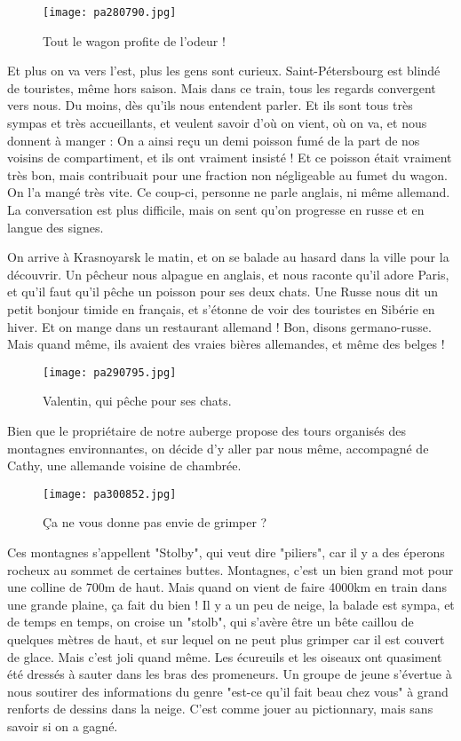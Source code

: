 \documentclass{book}
\begin{document}
\begin{wrapfigure}{l}{0.55\textwidth}
\centering
\texttt{[image: pa280790.jpg]}
\caption*{ Tout le wagon profite de l'odeur !}
\end{wrapfigure}


Et plus on va vers l'est, plus les gens sont curieux. Saint-Pétersbourg est blindé de touristes, même hors saison. Mais dans ce train, tous les regards convergent vers nous. Du moins, dès qu'ils nous entendent parler. Et ils sont tous très sympas et très accueillants, et veulent savoir d'où on vient, où on va, et nous donnent à manger : On a ainsi reçu un demi poisson fumé de la part de nos voisins de compartiment, et ils ont vraiment insisté ! Et ce poisson était vraiment très bon, mais contribuait pour une fraction non négligeable au fumet du wagon. On l'a mangé très vite. Ce coup-ci, personne ne parle anglais, ni même allemand. La conversation est plus difficile, mais on sent qu'on progresse en russe et en langue des signes.


On arrive à Krasnoyarsk le matin, et on se balade au hasard dans la ville pour la découvrir. Un pêcheur nous alpague en anglais, et nous raconte qu'il adore Paris, et qu'il faut qu'il pêche un poisson pour ses deux chats. Une Russe nous dit un petit bonjour timide en français, et s'étonne de voir des touristes en Sibérie en hiver. Et on mange dans un restaurant allemand ! Bon, disons germano-russe. Mais quand même, ils avaient des vraies bières allemandes, et même des belges !


\begin{figure}[h]
\centering
\texttt{[image: pa290795.jpg]}
\caption*{ Valentin, qui pêche pour ses chats.}
\end{figure}

Bien que le propriétaire de notre auberge propose des tours organisés des montagnes environnantes, on décide d'y aller par nous même, accompagné de Cathy, une allemande voisine de chambrée.


\begin{figure}[h]
\centering
\texttt{[image: pa300852.jpg]}
\caption*{ Ça ne vous donne pas envie de grimper ?}
\end{figure}

Ces montagnes s'appellent "Stolby", qui veut dire "piliers", car il y a des éperons rocheux au sommet de certaines buttes. Montagnes, c'est un bien grand mot pour une colline de 700m de haut. Mais quand on vient de faire 4000km en train dans une grande plaine, ça fait du bien ! Il y a un peu de neige, la balade est sympa, et de temps en temps, on croise un "stolb", qui s'avère être un bête caillou de quelques mètres de haut, et sur lequel on ne peut plus grimper car il est couvert de glace. Mais c'est joli quand même. Les écureuils et les oiseaux ont quasiment été dressés à sauter dans les bras des promeneurs. Un groupe de jeune s'évertue à nous soutirer des informations du genre "est-ce qu'il fait beau chez vous" à grand renforts de dessins dans la neige. C'est comme jouer au pictionnary, mais sans savoir si on a gagné.
\end{document}
